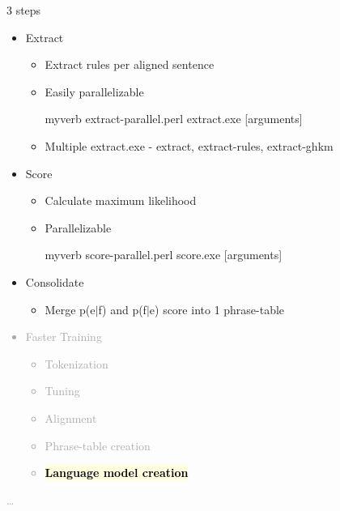 \documentclass[landscape]{uedslides2C}
\newcommand{\currenttopic}[1]{\colorbox{lightyellow}{\textcolor{black}{\bf #1}}}
\begin{document}
3 steps
\begin{itemize} \itemsep 0mm
\small
\item Extract
  \begin{itemize}
  \item Extract rules per aligned sentence
  \item Easily parallelizable

    \begin{SaveVerbatim}{myverb} 
extract-parallel.perl extract.exe [arguments]
    \end{SaveVerbatim}
    \colorbox{gray}{}  
  \item Multiple extract.exe - extract, extract-rules, extract-ghkm
  \end{itemize}
\item Score
  \begin{itemize}
  \item Calculate maximum likelihood
  \item Parallelizable

      \begin{SaveVerbatim}{myverb} 
score-parallel.perl score.exe [arguments]
    \end{SaveVerbatim}
    \colorbox{gray}{}  
  \end{itemize}
  \item Consolidate
    \begin{itemize}
    \item Merge p(e$|$f) and p(f$|$e) score into 1 phrase-table
   \end{itemize}
\end{itemize}


\vspace{-5mm}
\textcolor{darkgrey}{
\begin{itemize} \itemsep -1mm
\item Faster Training
  \begin{itemize}
  \item Tokenization
  \item Tuning
  \item Alignment
  \item Phrase-table creation
  \item \currenttopic{Language model creation}
  \end{itemize}
\end{itemize}
\ldots
}
\end{document}
